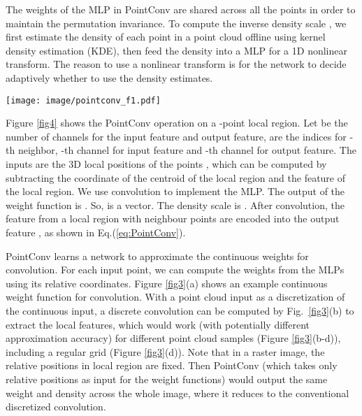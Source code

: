 \documentclass[10pt,twocolumn,letterpaper]{article}
\begin{document}
The weights of the MLP in PointConv are shared across all the points in order to maintain the permutation invariance. To compute the inverse density scale , we first estimate the density of each point in a point cloud offline using kernel density estimation (KDE), then feed the density into a MLP for a 1D nonlinear transform. The reason to use a nonlinear transform is for the network to decide adaptively whether to use the density estimates. 



\begin{figure*}
\begin{center}
\texttt{[image: image/pointconv\_f1.pdf]}
\end{center}
   \caption{\textbf{PointConv}. (a) shows a local region with the coordinates of points transformed from global into local coordinates,  is the coordinates of points, and  is the corresponding feature; (b) shows the process of conducting PointConv on one local region centered around one point . The input features come form the K nearest neighbors centered at , and the output feature is  at .}
\label{fig4}
\vskip -0.15in
\end{figure*}

Figure \ref{fig4} shows the PointConv operation on a -point local region. Let  be the number of channels for the input feature and output feature,  are the indices for -th neighbor, -th channel for input feature and -th channel for output feature. The inputs are the 3D local positions of the points , which can be computed by subtracting the coordinate of the centroid of the local region and the feature  of the local region. We use  convolution to implement the MLP. The output of the weight function is . So,  is a vector. The density scale is . After convolution, the feature  from a local region with  neighbour points are encoded into the output feature , as shown in Eq.(\ref{eq:PointConv}).
\vspace{-0.05in}

\vskip -0.05in

PointConv learns a network to approximate the continuous weights for convolution. For each input point, we can compute the weights from the MLPs using its relative coordinates. 
Figure \ref{fig3}(a) shows an example continuous weight function for convolution. 
With a point cloud input as a discretization of the continuous input, a discrete convolution can be computed by Fig.~\ref{fig3}(b) to extract the local features, which would work (with potentially different approximation accuracy) for different point cloud samples (Figure \ref{fig3}(b-d)), including a regular grid (Figure \ref{fig3}(d)). Note that in a raster image, the relative positions in local region are fixed. Then PointConv (which takes only relative positions as input for the weight functions) would output the same weight and density across the whole image, where it reduces to the conventional discretized convolution. 
\end{document}
